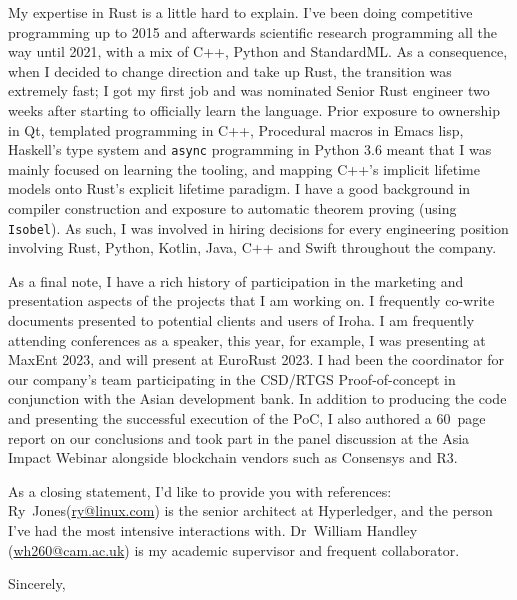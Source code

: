\documentclass[11pt]{scrlttr2}
\begin{document}
\begin{letter}{
}
My expertise in Rust is a little hard to explain.  I've been doing
competitive programming up to 2015 and afterwards scientific research
programming all the way until 2021, with a mix of C++, Python and
StandardML.  As a consequence, when I decided to change direction and
take up Rust, the transition was extremely fast; I got my first job
and was nominated Senior Rust engineer two weeks after starting to
officially learn the language.  Prior exposure to ownership in Qt,
templated programming in C++, Procedural macros in Emacs lisp,
Haskell's type system and \texttt{async} programming in Python 3.6
meant that I was mainly focused on learning the tooling, and mapping
C++'s implicit lifetime models onto Rust's explicit lifetime paradigm.
I have a good background in compiler construction and exposure to
automatic theorem proving (using \texttt{Isobel}).  As such, I was
involved in hiring decisions for every engineering position involving
Rust, Python, Kotlin, Java, C++ and Swift throughout the company.

As a final note, I have a rich history of participation in the
marketing and presentation aspects of the projects that I am working
on.  I frequently co-write documents presented to potential clients
and users of Iroha.  I am frequently attending conferences as a
speaker, this year, for example, I was presenting at MaxEnt 2023, and
will present at EuroRust 2023.  I had been the coordinator for our
company's team participating in the CSD/RTGS Proof-of-concept in
conjunction with the Asian development bank.  In addition to producing
the code and presenting the successful execution of the PoC, I also
authored a 60~page report on our conclusions and took part in the
panel discussion at the Asia Impact Webinar alongside blockchain
vendors such as Consensys and R3. 

As a closing statement, I'd like to provide you with references:
Ry~Jones(\href{mailto:ry@linux.com}{ry@linux.com}) is the senior
architect at Hyperledger, and the person I've had the most intensive
interactions with. Dr~William Handley
(\href{mailto:wh260@cam.ac.uk}{wh260@cam.ac.uk}) is my academic
supervisor and frequent collaborator.

Sincerely, \\
\end{letter}
\end{document}
